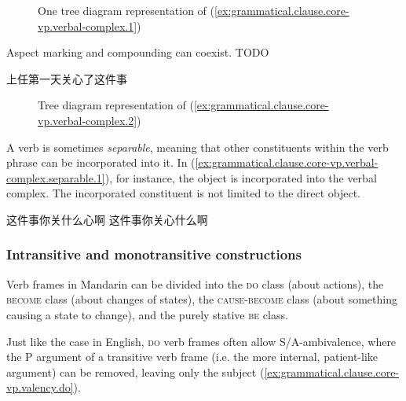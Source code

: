 \documentclass[UTF8, a4paper, oneside, scheme=plain, 12pt]{ctexrep}
\newcommand*{\category}[1]{\textsc{#1}}
\begin{document}
\begin{figure}[H]
    \centering
    {
        \small
        
    }
    \caption{One tree diagram representation of (\ref{ex:grammatical.clause.core-vp.verbal-complex.1})}
    \label{fig:grammatical.clause.core-vp.verbal-complex.1.1}
\end{figure}

Aspect marking and compounding can coexist. TODO

\begin{exe}
    \ex\label{ex:grammatical.clause.core-vp.verbal-complex.2} 上任第一天关心了这件事
\end{exe}

\begin{figure}[H]
    {
        \centering
        \small
        
    }
    \caption{Tree diagram representation of (\ref{ex:grammatical.clause.core-vp.verbal-complex.2})}
    \label{fig:grammatical.clause.core-vp.verbal-complex.2}
\end{figure}

A verb is sometimes \emph{separable},
meaning that other constituents within the verb phrase can be incorporated into it.
In (\ref{ex:grammatical.clause.core-vp.verbal-complex.separable.1}),
for instance, the object is incorporated into the verbal complex.
The incorporated constituent is not limited to the direct object.

\begin{exe}
    \ex\label{ex:grammatical.clause.core-vp.verbal-complex.separable.1} \begin{xlist}
        \ex 这件事你关什么心啊
        \ex 这件事你关心什么啊
    \end{xlist}
\end{exe}
 
\subsubsection{Intransitive and monotransitive constructions}\label{sec:grammatical.clause.core-vp.transitivity}

Verb frames in Mandarin can be divided into the \category{do} class (about actions),
the \category{become} class (about changes of states),
the \category{cause}-\category{become} class (about something causing a state to change),
and the purely stative \category{be} class.

Just like the case in English, \category{do} verb frames often allow S/A-ambivalence,
where the P argument of a transitive verb frame (i.e. the more internal, patient-like argument) can be removed, leaving only the subject (\ref{ex:grammatical.clause.core-vp.valency.do}).
\end{document}
